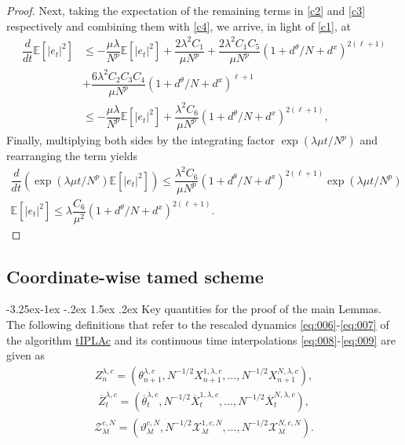 \documentclass[a4paper, 10pt]{article}
\makeatletter
\theoremstyle{plain}%
\renewcommand\subsubsection{\@startsection{subsubsection}{3}{\z@}%
  {-3.25ex\@plus -1ex \@minus -.2ex}%
  {1.5ex \@plus .2ex}%
  {\normalfont\small\itshape\mdseries}}
\makeatother
\begin{document}
\begin{proof}
Next, taking the expectation of the remaining terms in \eqref{c2} and \eqref{c3} respectively and combining them with \eqref{c4}, we arrive, in light of \eqref{c1}, at
\begin{align*}
\dfrac{d}{dt}\mathbb{E}\left[|e_t|^2\right]&\leq -\dfrac{\mu\lambda}{N^p}\mathbb{E}\left[|e_t|^2\right]+\dfrac{2\lambda^2C_1}{\mu N^{p}} +\dfrac{2\lambda^2C_1C_5}{\mu N^p}(1+d^{\theta}/N+d^x)^{2(\ell+1)}\\
&+\dfrac{6\lambda^2 C_2C_3C_4}{\mu N^p}(1+d^{\theta}/N+d^x)^{\ell+1}\\
&\leq  -\dfrac{\mu\lambda}{N^p}\mathbb{E}\left[|e_t|^2\right]+\dfrac{\lambda^2 C_6}{\mu N^p}(1+d^{\theta}/N+d^x)^{2(\ell+1)},
\end{align*}
Finally, multiplying both sides by the integrating factor $\exp{(\lambda\mu t/N^p)}$ and rearranging the term yields
\begin{gather*}
\dfrac{d}{dt}\left(\exp{\left(\lambda\mu t/N^p\right)}\mathbb{E}\left[|e_t|^2\right]\right)\leq\dfrac{\lambda^2 C_6}{\mu N^p}(1+d^{\theta}/N+d^x)^{2(\ell+1)} \exp{\left(\lambda\mu t/N^p\right)}\\
\mathbb{E}\left[|e_t|^2\right]\leq \lambda \dfrac{C_6}{\mu^2}(1+d^{\theta}/N+d^x)^{2(\ell+1)}.
\end{gather*}
\end{proof}
\subsection{Coordinate-wise tamed scheme}
\subsubsection{Key quantities for the proof of the main Lemmas.}
The following definitions that refer to the rescaled dynamics \eqref{eq:006}-\eqref{eq:007} of the algorithm \hyperref[algo2]{tIPLAc} and its continuous time interpolations \eqref{eq:008}-\eqref{eq:009} are given as\begin{align} Z^{\lambda,c}_{n}=\left(\theta_{n+1}^{\lambda,c},N^{-1/2}X_{n+1}^{1,\lambda,c},\ldots,N^{-1/2}X_{n+1}^{N,\lambda,c}\right),\label{rescale_cord}\end{align}
\begin{align} \overline{Z}^{\lambda,c}_t=\left(\overline{\theta}^{\lambda,c}_t,N^{-1/2}\overline{X}^{1,\lambda,c}_t,\ldots,N^{-1/2}\overline{X}^{N,\lambda,c}_t\right),\label{rescale2_cord}\end{align}
\begin{align} \mathcal{Z}_{\lambda t}^{c,N}=\left(\vartheta_{\lambda t}^{c,N},N^{-1/2}\mathcal{X}_{\lambda t}^{1,c,N},\ldots,N^{-1/2}\mathcal{X}_{\lambda t}^{N,c,N}\right).\label{rescale3_cord} \end{align}
\end{document}
